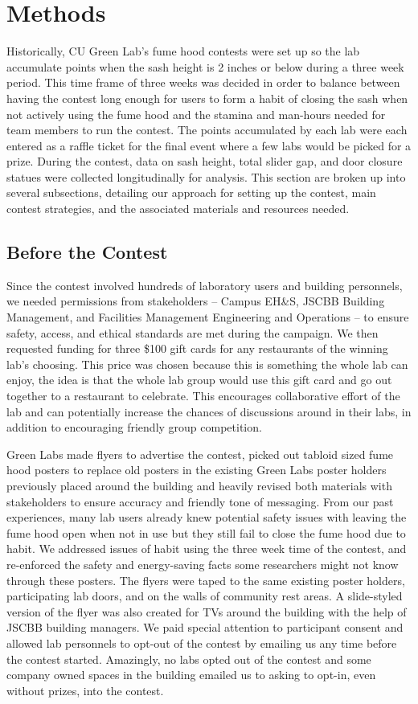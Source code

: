 \documentclass[12pt, twocolumn]{article}
\begin{document}
\section*{Methods}\label{Sec:Methods}
Historically, CU Green Lab's fume hood contests were set up so the lab accumulate points when the sash height is 2 inches or below during a three week period. This time frame of three weeks was decided in order to balance between having the contest long enough for users to form a habit of closing the sash when not actively using the fume hood and the stamina and man-hours needed for team members to run the contest. The points accumulated by each lab were each entered as a raffle ticket for the final event where a few labs would be picked for a prize. During the contest, data on sash height, total slider gap, and door closure statues were collected longitudinally for analysis. This section are broken up into several subsections, detailing our approach for setting up the contest, main contest strategies, and the associated materials and resources needed.
\subsection*{Before the Contest}\label{Sec:BeforeContest}
Since the contest involved hundreds of laboratory users and building personnels, we needed permissions from stakeholders -- Campus EH\&S, JSCBB Building Management, and Facilities Management Engineering and Operations -- to ensure safety, access, and ethical standards are met during the campaign.  We then requested funding for three \$100 gift cards for any restaurants of the winning lab's choosing. This price was chosen because this is something the whole lab can enjoy, the idea is that the whole lab group would use this gift card and go out together to a restaurant to celebrate. This encourages collaborative effort of the lab and can potentially increase the chances of discussions around in their labs, in addition to encouraging friendly group competition.

Green Labs made flyers to advertise the contest, picked out tabloid sized fume hood posters to replace old posters in the existing Green Labs poster holders previously placed around the building and heavily revised both materials with stakeholders to ensure accuracy and friendly tone of messaging. From our past experiences, many lab users already knew potential safety issues with leaving the fume hood open when not in use but they still fail to close the fume hood due to habit. We addressed issues of habit using the three week time of the contest, and re-enforced the safety and energy-saving facts some researchers might not know through these posters. The flyers were taped to the same existing poster holders, participating lab doors, and on the walls of community rest areas. A slide-styled version of the flyer was also created for TVs around the building with the help of JSCBB building managers. We paid special attention to participant consent and allowed lab personnels to opt-out of the contest by emailing us any time before the contest started. Amazingly, no labs opted out of the contest and some company owned spaces in the building emailed us to asking to opt-in, even without prizes, into the contest.
\end{document}
